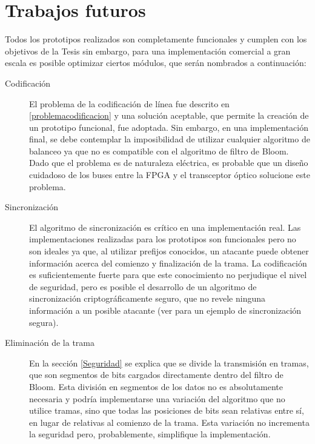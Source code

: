 \section{Trabajos futuros}

Todos los prototipos realizados son completamente funcionales y cumplen con los objetivos de la Tesis sin embargo, para una implementación comercial a gran escala es posible optimizar ciertos módulos, que serán nombrados a continuación:
\begin{description}
 \item[Codificación] 
El problema de la codificación de línea fue descrito en \ref{problemacodificacion} y una solución aceptable, que permite la creación de un prototipo funcional, fue adoptada. Sin embargo, en una implementación final, se debe contemplar la imposibilidad de utilizar cualquier algoritmo de balanceo ya que no es compatible con el algoritmo de filtro de Bloom. Dado que el problema es de naturaleza eléctrica, es probable que un diseño cuidadoso de los buses entre la FPGA y el transceptor óptico solucione este problema.
 \item[Sincronización] 
 El algoritmo de sincronización es crítico en una implementación real. Las implementaciones realizadas para los prototipos son funcionales pero no son ideales ya que, al utilizar prefijos conocidos, un atacante puede obtener información acerca del comienzo y finalización de la trama. La codificación es suficientemente fuerte para que este conocimiento no perjudique el nivel de seguridad, pero es posible el desarrollo de un algoritmo de sincronización criptográficamente seguro, que no revele ninguna información a un posible atacante (ver \cite{jung1999encryption} para un ejemplo de sincronización segura).
 \item[Eliminación de la trama] 
 En la sección \ref{Seguridad} se explica que se divide la transmisión en tramas, que son segmentos de bits cargados directamente dentro del filtro de Bloom. Esta división en segmentos de los datos no es absolutamente necesaria y podría implementarse una variación del algoritmo que no utilice tramas, sino que todas las posiciones de bits sean relativas entre sí, en lugar de relativas al comienzo de la trama. Esta variación no incrementa la seguridad pero, probablemente, simplifique la implementación.
 \item[] 
\end{description}

